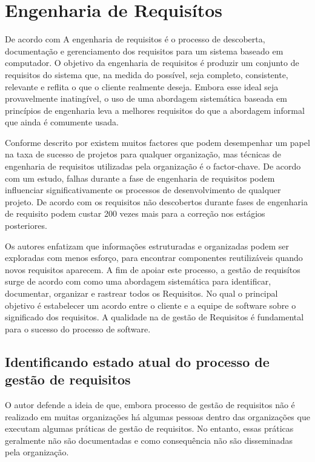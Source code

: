 \section{Engenharia de Requisítos}
De acordo com \cite{sommerville1997requirements} A engenharia de requisitos é o processo de descoberta, documentação e gerenciamento dos requisitos para um sistema baseado em computador. O objetivo da engenharia de requisitos é produzir um conjunto de requisitos do sistema que, na medida do possível, seja completo, consistente, relevante e reflita o que o cliente realmente deseja. Embora esse ideal seja provavelmente inatingível, o uso de uma abordagem sistemática baseada em princípios de engenharia leva a melhores requisitos do que a abordagem informal que ainda é comumente usada. 

Conforme descrito por \cite{riaz2018customization} existem muitos factores que podem desempenhar um papel na taxa de sucesso de projetos para qualquer organização, mas técnicas de engenharia de requisitos utilizadas pela organização é o factor-chave. De acordo com um estudo, falhas durante a fase de engenharia de requisitos podem
influenciar significativamente os processos de desenvolvimento de
qualquer projeto. De acordo com \cite{riaz2018customization} os requisitos não descobertos durante
fases de engenharia de requisito podem custar 200 vezes
mais para a correção nos estágios posteriores. 
 
Os autores \cite{arias2018framework} enfatizam que informações estruturadas e organizadas podem ser exploradas com menos esforço,
para encontrar componentes reutilizáveis quando novos requisitos aparecem. A fim de apoiar este processo, a gestão de requisítos surge de acordo com \cite{cuevas2004assessment} como uma abordagem sistemática para identificar, documentar, organizar e rastrear todos os Requisitos. No qual o principal objetivo é estabelecer um acordo entre o cliente e a equipe de software sobre o significado dos requisitos. A qualidade na de gestão de Requisitos é fundamental para o sucesso do processo de software.

\subsection{Identificando estado atual do processo de gestão de requisitos}

O autor \cite{cuevas2004assessment} defende a ideia de que, embora processo de gestão de requisitos não é realizado em
muitas organizações há algumas pessoas dentro das
organizações que executam algumas práticas de gestão de requisitos. No entanto, essas práticas
geralmente não são documentadas e como consequência não são disseminadas pela organização. 

